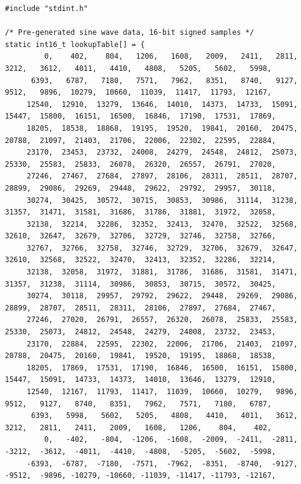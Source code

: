 \documentclass[11pt,pdftex,portrait,letterpaper]{article}
\begin{document}
\begin{lstlisting}[caption={myNCO}, label=l:myNCO]
#include "stdint.h"

/* Pre-generated sine wave data, 16-bit signed samples */
static int16_t lookupTable[] = {
         0,    402,    804,   1206,   1608,   2009,   2411,   2811,   3212,   3612,   4011,   4410,   4808,   5205,   5602,   5998,
      6393,   6787,   7180,   7571,   7962,   8351,   8740,   9127,   9512,   9896,  10279,  10660,  11039,  11417,  11793,  12167,
     12540,  12910,  13279,  13646,  14010,  14373,  14733,  15091,  15447,  15800,  16151,  16500,  16846,  17190,  17531,  17869,
     18205,  18538,  18868,  19195,  19520,  19841,  20160,  20475,  20788,  21097,  21403,  21706,  22006,  22302,  22595,  22884,
     23170,  23453,  23732,  24008,  24279,  24548,  24812,  25073,  25330,  25583,  25833,  26078,  26320,  26557,  26791,  27020,
     27246,  27467,  27684,  27897,  28106,  28311,  28511,  28707,  28899,  29086,  29269,  29448,  29622,  29792,  29957,  30118,
     30274,  30425,  30572,  30715,  30853,  30986,  31114,  31238,  31357,  31471,  31581,  31686,  31786,  31881,  31972,  32058,
     32138,  32214,  32286,  32352,  32413,  32470,  32522,  32568,  32610,  32647,  32679,  32706,  32729,  32746,  32758,  32766,
     32767,  32766,  32758,  32746,  32729,  32706,  32679,  32647,  32610,  32568,  32522,  32470,  32413,  32352,  32286,  32214,
     32138,  32058,  31972,  31881,  31786,  31686,  31581,  31471,  31357,  31238,  31114,  30986,  30853,  30715,  30572,  30425,
     30274,  30118,  29957,  29792,  29622,  29448,  29269,  29086,  28899,  28707,  28511,  28311,  28106,  27897,  27684,  27467,
     27246,  27020,  26791,  26557,  26320,  26078,  25833,  25583,  25330,  25073,  24812,  24548,  24279,  24008,  23732,  23453,
     23170,  22884,  22595,  22302,  22006,  21706,  21403,  21097,  20788,  20475,  20160,  19841,  19520,  19195,  18868,  18538,
     18205,  17869,  17531,  17190,  16846,  16500,  16151,  15800,  15447,  15091,  14733,  14373,  14010,  13646,  13279,  12910,
     12540,  12167,  11793,  11417,  11039,  10660,  10279,   9896,   9512,   9127,   8740,   8351,   7962,   7571,   7180,   6787,
      6393,   5998,   5602,   5205,   4808,   4410,   4011,   3612,   3212,   2811,   2411,   2009,   1608,   1206,    804,    402,
         0,   -402,   -804,  -1206,  -1608,  -2009,  -2411,  -2811,  -3212,  -3612,  -4011,  -4410,  -4808,  -5205,  -5602,  -5998,
     -6393,  -6787,  -7180,  -7571,  -7962,  -8351,  -8740,  -9127,  -9512,  -9896, -10279, -10660, -11039, -11417, -11793, -12167,

\end{lstlisting}
\end{document}
